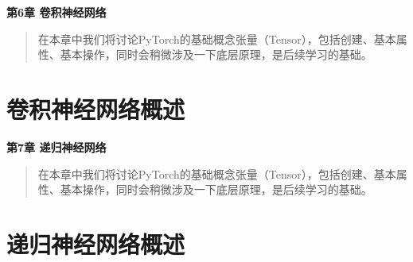 \documentclass[UTF8]{article}
\begin{document}
\newpage
\maketitle
\begin{center}
\Large \textbf{第6章 卷积神经网络} \quad \textbf{}
\end{center}
\begin{abstract}
在本章中我们将讨论PyTorch的基础概念张量（Tensor），包括创建、基本属性、基本操作，同时会稍微涉及一下底层原理，是后续学习的基础。
\end{abstract}
\section{卷积神经网络概述}

\newpage
\maketitle
\begin{center}
\Large \textbf{第7章 递归神经网络} \quad \textbf{}
\end{center}
\begin{abstract}
在本章中我们将讨论PyTorch的基础概念张量（Tensor），包括创建、基本属性、基本操作，同时会稍微涉及一下底层原理，是后续学习的基础。
\end{abstract}
\section{递归神经网络概述}



\newpage




\appendix
\end{document}
